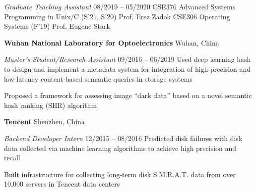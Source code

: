 \documentclass[letterpaper,10pt,oneside]{article}
\begin{document}
\begin{body}
\emph{Graduate Teaching Assistant}
\hfill
08/2019 --
05/2020
\GapNoBreak
\BulletItem
CSE376 Advanced Systems Programming in Unix/C (S'21, S'20) Prof. Erez Zadok
\GapNoBreak
\BulletItem
CSE306 Operating Systems (F'19) Prof. Eugene Stark


\BigGap
{\textbf{Wuhan National Laboratory for Optoelectronics}}
\hfill
Wuhan, China

\emph{Master's Student/Research Assistant}
\hfill
09/2016 --
06/2019
\GapNoBreak
\BulletItem
Used deep learning hash to design and implement a metadata system for integration of high-precision and low-latency content-based semantic queries in storage systems

\GapNoBreak
\BulletItem
Proposed a framework for assessing image ``dark data'' based on a novel semantic hash ranking (SHR) algorithm



\BigGap
{\textbf{Tencent}} %
\hfill
Shenzhen, China

\emph{Backend Developer Intern}
\hfill
12/2015 --
08/2016
\GapNoBreak
\BulletItem
Predicted disk failures with disk data collected via machine learning algorithms to achieve high precision and recall

\GapNoBreak
\BulletItem
Built infrastructure for collecting long-term disk S.M.R.A.T. data from over 10,000 servers in Tencent data centers





\end{body}
\end{document}

